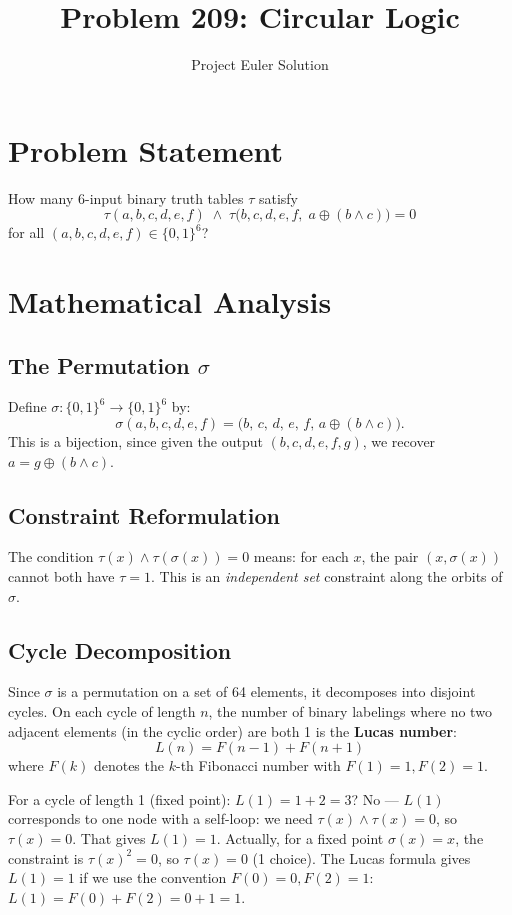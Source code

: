 \documentclass[12pt]{article}
\title{Problem 209: Circular Logic}
\author{Project Euler Solution}
\date{}
\begin{document}
\maketitle

\section{Problem Statement}
How many 6-input binary truth tables $\tau$ satisfy
\[
\tau(a,b,c,d,e,f) \;\wedge\; \tau\bigl(b,c,d,e,f,\;a \oplus (b \wedge c)\bigr) = 0
\]
for all $(a,b,c,d,e,f) \in \{0,1\}^6$?

\section{Mathematical Analysis}

\subsection{The Permutation $\sigma$}
Define $\sigma : \{0,1\}^6 \to \{0,1\}^6$ by:
\[
\sigma(a,b,c,d,e,f) = \bigl(b,\, c,\, d,\, e,\, f,\, a \oplus (b \wedge c)\bigr).
\]
This is a bijection, since given the output $(b,c,d,e,f,g)$, we recover $a = g \oplus (b \wedge c)$.

\subsection{Constraint Reformulation}
The condition $\tau(x) \wedge \tau(\sigma(x)) = 0$ means: for each $x$, the pair $(x, \sigma(x))$ cannot both have $\tau = 1$. This is an \emph{independent set} constraint along the orbits of $\sigma$.

\subsection{Cycle Decomposition}
Since $\sigma$ is a permutation on a set of 64 elements, it decomposes into disjoint cycles. On each cycle of length $n$, the number of binary labelings where no two adjacent elements (in the cyclic order) are both 1 is the \textbf{Lucas number}:
\[
L(n) = F(n-1) + F(n+1)
\]
where $F(k)$ denotes the $k$-th Fibonacci number with $F(1)=1, F(2)=1$.

For a cycle of length 1 (fixed point): $L(1) = 1 + 2 = 3$? No --- $L(1)$ corresponds to one node with a self-loop: we need $\tau(x) \wedge \tau(x) = 0$, so $\tau(x) = 0$. That gives $L(1) = 1$. Actually, for a fixed point $\sigma(x) = x$, the constraint is $\tau(x)^2 = 0$, so $\tau(x) = 0$ (1 choice). The Lucas formula gives $L(1) = 1$ if we use the convention $F(0) = 0, F(2) = 1$: $L(1) = F(0) + F(2) = 0 + 1 = 1$. \checkmark
\end{document}
